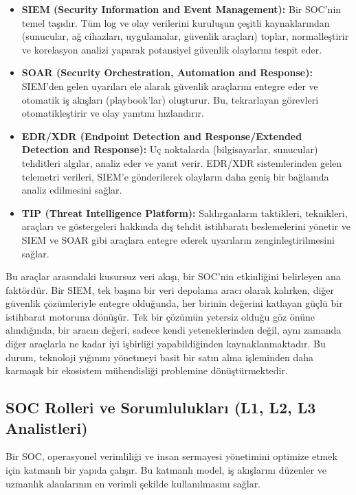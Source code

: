 \begin{itemize}
    \item \textbf{SIEM (Security Information and Event Management):} Bir SOC'nin temel taşıdır. Tüm log ve olay verilerini kuruluşun çeşitli kaynaklarından (sunucular, ağ cihazları, uygulamalar, güvenlik araçları) toplar, normalleştirir ve korelasyon analizi yaparak potansiyel güvenlik olaylarını tespit eder.
    \item \textbf{SOAR (Security Orchestration, Automation and Response):} SIEM'den gelen uyarıları ele alarak güvenlik araçlarını entegre eder ve otomatik iş akışları (playbook'lar) oluşturur. Bu, tekrarlayan görevleri otomatikleştirir ve olay yanıtını hızlandırır.
    \item \textbf{EDR/XDR (Endpoint Detection and Response/Extended Detection and Response):} Uç noktalarda (bilgisayarlar, sunucular) tehditleri algılar, analiz eder ve yanıt verir. EDR/XDR sistemlerinden gelen telemetri verileri, SIEM'e gönderilerek olayların daha geniş bir bağlamda analiz edilmesini sağlar.
    \item \textbf{TIP (Threat Intelligence Platform):} Saldırganların taktikleri, teknikleri, araçları ve göstergeleri hakkında dış tehdit istihbaratı beslemelerini yönetir ve SIEM ve SOAR gibi araçlara entegre ederek uyarıların zenginleştirilmesini sağlar.
\end{itemize}

Bu araçlar arasındaki kusursuz veri akışı, bir SOC'nin etkinliğini belirleyen ana faktördür. Bir SIEM, tek başına bir veri depolama aracı olarak kalırken, diğer güvenlik çözümleriyle entegre olduğunda, her birinin değerini katlayan güçlü bir istihbarat motoruna dönüşür. Tek bir çözümün yetersiz olduğu göz önüne alındığında, bir aracın değeri, sadece kendi yeteneklerinden değil, aynı zamanda diğer araçlarla ne kadar iyi işbirliği yapabildiğinden kaynaklanmaktadır. Bu durum, teknoloji yığınını yönetmeyi basit bir satın alma işleminden daha karmaşık bir ekosistem mühendisliği problemine dönüştürmektedir.

\subsection{SOC Rolleri ve Sorumlulukları (L1, L2, L3 Analistleri)}

Bir SOC, operasyonel verimliliği ve insan sermayesi yönetimini optimize etmek için katmanlı bir yapıda çalışır. Bu katmanlı model, iş akışlarını düzenler ve uzmanlık alanlarının en verimli şekilde kullanılmasını sağlar.

